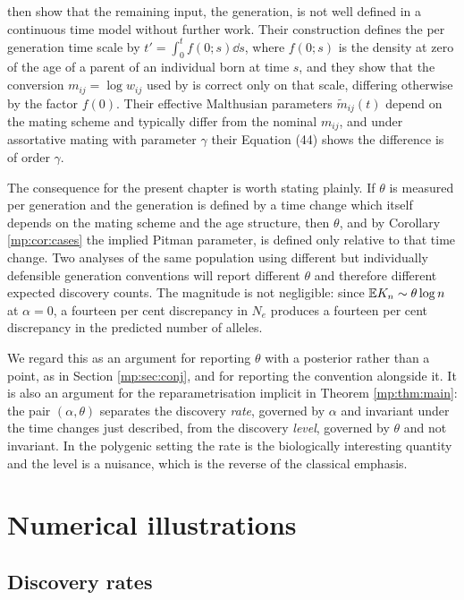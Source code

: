 \citet{mp:hossjer2025} then show that the remaining input, the generation, is not
well defined in a continuous time model without further work. Their construction defines
the per generation time scale by $t'=\int_0^t f(0;s)\dd s$, where $f(0;s)$ is the density at
zero of the age of a parent of an individual born at time $s$, and they show that the
conversion $m_{ij}=\log w_{ij}$ used by \citet{mp:crow1970} is correct only on that
scale, differing otherwise by the factor $f(0)$. Their effective Malthusian parameters
$\tilde m_{ij}(t)$ depend on the mating scheme and typically differ from the nominal
$m_{ij}$, and under assortative mating with parameter $\gamma$ their Equation (44) shows the
difference is of order $\gamma$.

The consequence for the present chapter is worth stating plainly. If $\theta$ is measured per
generation and the generation is defined by a time change which itself depends on the mating
scheme and the age structure, then $\theta$, and by Corollary \ref{mp:cor:cases} the implied
Pitman parameter, is defined only relative to that time change. Two analyses of the same
population using different but individually defensible generation conventions will report
different $\theta$ and therefore different expected discovery counts. The magnitude is not
negligible: since $\mathbb{E} K_n\sim\theta\log n$ at $\alpha=0$, a fourteen per cent discrepancy in
$N_e$ produces a fourteen per cent discrepancy in the predicted number of alleles.

We regard this as an argument for reporting $\theta$ with a posterior rather than a point,
as in Section \ref{mp:sec:conj}, and for reporting the convention alongside it. It is also an
argument for the reparametrisation implicit in Theorem \ref{mp:thm:main}: the pair
$(\alpha,\theta)$ separates the discovery \emph{rate}, governed by $\alpha$ and invariant
under the time changes just described, from the discovery \emph{level}, governed by $\theta$
and not invariant. In the polygenic setting the rate is the biologically interesting
quantity and the level is a nuisance, which is the reverse of the classical emphasis.

\section{Numerical illustrations}
\label{mp:sec:num}

\subsection{Discovery rates}
\label{mp:sec:numA}

